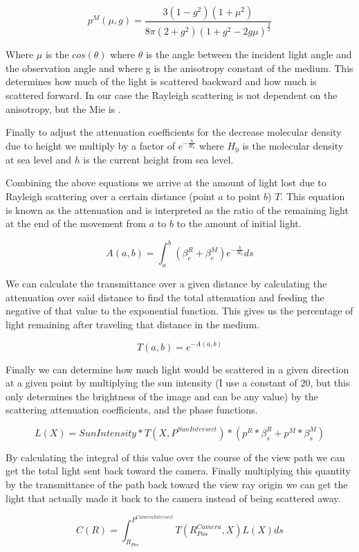 \documentclass[12pt, letterpaper]{article}
\begin{document}
\[
  p^M(\mu, g) = \frac{3(1-g^2)(1+\mu^2)}{8\pi(2 + g^2)(1 + g^2 - 2g\mu)^{\frac{3}{2}}}
\]

Where $\mu$ is the $cos(\theta)$ where $\theta$ is the angle between the
incident light angle and the observation angle and where g is the anisotropy
constant of the medium. This determines how much of the light is scattered
backward and how much is scattered forward. In our case the Rayleigh scattering
is not dependent on the anisotropy, but the Mie is \cite{scratch}.

Finally to adjust the attenuation coefficients for the decrease molecular
density due to height we multiply by a factor of $e^{-\frac{h}{H_0}}$ where
$H_0$ is the molecular density at sea level and $h$ is the current height from
sea level.

Combining the above equations we arrive at the amount of light lost due to
Rayleigh scattering over a certain distance (point $a$ to point $b$) $T$. This
equation is known as the attenuation and is interpreted as the ratio of the
remaining light at the end of the movement from $a$ to $b$ to the amount of
initial light.

\[
  A(a, b) = \int^b_a (\beta^R_e + \beta^M_e) e^{-\frac{h}{H_0}}ds 
\]

We can calculate the transmittance over a given distance by calculating the
attenuation over said distance to find the total attenuation and feeding the
negative of that value to the exponential function. This gives us the percentage
of light remaining after traveling that distance in the medium.

\[
  T(a, b) = e^{-A(a, b)}
\]

Finally we can determine how much light would be scattered in a given direction
at a given point by multiplying the sun intensity (I use a constant of 20, but
this only determines the brightness of the image and can be any value) by the
scattering attenuation coefficients, and the phase functions.

\[
  L(X) = SunIntensity * T(X, P^{SunIntersect}) * (p^R * \beta^R_s + p^M * \beta^M_s)
\]

By calculating the integral of this value over the course of the view path we
can get the total light sent back toward the camera. Finally multiplying this
quantity by the transmittance of the path back toward the view ray origin we can
get the light that actually made it back to the camera instead of being
scattered away.

\[
  C(R) = \int_{R_{Pos}}^{P^{CameraIntersect}}T(R^{Camera}_{Pos},X)L(X)ds
\]
\end{document}
